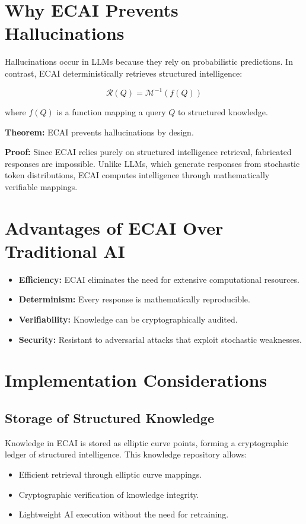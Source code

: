 \documentclass{article}
\begin{document}
\section{Why ECAI Prevents Hallucinations}

Hallucinations occur in LLMs because they rely on probabilistic predictions. In contrast, ECAI deterministically retrieves structured intelligence:

\begin{equation}
\mathcal{R}(Q) = \mathcal{M}^{-1} \left( f(Q) \right)
\end{equation}

where $f(Q)$ is a function mapping a query $Q$ to structured knowledge.

\textbf{Theorem:} ECAI prevents hallucinations by design.

\textbf{Proof:} Since ECAI relies purely on structured intelligence retrieval, fabricated responses are impossible. Unlike LLMs, which generate responses from stochastic token distributions, ECAI computes intelligence through mathematically verifiable mappings.

\section{Advantages of ECAI Over Traditional AI}

\begin{itemize}
    \item \textbf{Efficiency:} ECAI eliminates the need for extensive computational resources.
    \item \textbf{Determinism:} Every response is mathematically reproducible.
    \item \textbf{Verifiability:} Knowledge can be cryptographically audited.
    \item \textbf{Security:} Resistant to adversarial attacks that exploit stochastic weaknesses.
\end{itemize}

\section{Implementation Considerations}

\subsection{Storage of Structured Knowledge}

Knowledge in ECAI is stored as elliptic curve points, forming a cryptographic ledger of structured intelligence. This knowledge repository allows:
\begin{itemize}
    \item Efficient retrieval through elliptic curve mappings.
    \item Cryptographic verification of knowledge integrity.
    \item Lightweight AI execution without the need for retraining.
\end{itemize}
\end{document}
